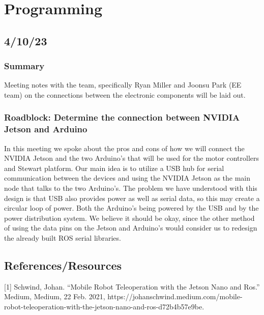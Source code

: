 \documentclass[a4paper, 10pt]{article}
\begin{document}
\section{Programming}
    \subsection{4/10/23}
        \subsubsection{Summary}
        Meeting notes with the team, specifically Ryan Miller and Joonsu Park (EE team) on the connections between the electronic components will be laid out.

        \subsubsection{Roadblock: Determine the connection between NVIDIA Jetson and Arduino}
        In this meeting we spoke about the pros and cons of how we will connect the NVIDIA Jetson and the two Arduino's that will be used for the motor controllers and Stewart platform. Our main idea is to utilize a USB hub for serial communication between the devices and using the NVIDIA Jetson as the main node that talks to the two Arduino's. The problem we have understood with this design is that USB also provides power as well as serial data, so this may create a circular loop of power. Both the Arduino's being powered by the USB and by the power distribution system. We believe it should be okay, since the other method of using the data pins on the Jetson and Arduino's would consider us to redesign the already built ROS serial libraries. 
        
    \subsection{References/Resources}
		[1] Schwind, Johan. “Mobile Robot Teleoperation with the Jetson Nano and Ros.” Medium, Medium, 22 Feb. 2021, https://johanschwind.medium.com/mobile-robot-teleoperation-with-the-jetson-nano-and-ros-d72b4b57e9be. 


  
\end{document}
